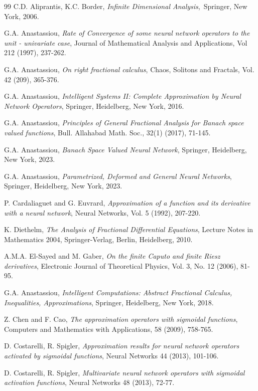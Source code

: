 \documentclass[10pt]{NSP1}
\numberwithin{equation}{section}
\begin{document}
\begin{thebibliography}{99}
 C.D. Aliprantis, K.C. Border, \textit{Infinite Dimensional
Analysis},\ Springer, New York, 2006.

 G.A. Anastassiou, \textit{Rate of Convergence of some neural
network operators to the unit - univariate case}, Journal of Mathematical
Analysis and Applications, Vol 212 (1997), 237-262.

 G.A. Anastassiou, \textit{On right fractional calculus}, Chaos,
Solitons and Fractals, Vol. 42 (209), 365-376.

 G.A. Anastassiou, \textit{Intelligent Systems II: Complete
Approximation by Neural Network Operators}, Springer, Heidelberg, New York,
2016.

 G.A. Anastassiou, \textit{Principles of General Fractional
Analysis for Banach space valued functions}, Bull. Allahabad Math. Soc.,
32(1) (2017), 71-145.

 G.A. Anastassiou, \textit{Banach Space Valued Neural Network},
Springer, Heidelberg, New York, 2023.

 G.A. Anastassiou, \textit{Parametrized, Deformed and General
Neural Networks}, Springer, Heidelberg, New York, 2023.

 P. Cardaliaguet and G. Euvrard, \textit{Approximation of a
function and its derivative with a neural network}, Neural Networks, Vol. 5
(1992), 207-220.

 K. Diethelm, \textit{The Analysis of Fractional Differential
Equations}, Lecture Notes in Mathematics 2004, Springer-Verlag, Berlin,
Heidelberg, 2010.

 A.M.A. El-Sayed and M. Gaber, \textit{On the finite Caputo and
finite Riesz derivatives}, Electronic Journal of Theoretical Physics, Vol.
3, No. 12 (2006), 81-95.

 G.A. Anastassiou, \textit{Intelligent Computations: Abstract
Fractional Calculus, Inequalities, Approximations}, Springer, Heidelberg,
New York, 2018.

 Z. Chen and F. Cao, \textit{The approximation operators with
sigmoidal functions}, Computers and Mathematics with Applications, 58
(2009), 758-765.

 D. Costarelli, R. Spigler, \textit{Approximation results for
neural network operators activated by sigmoidal functions}, Neural Networks
44 (2013), 101-106.

 D. Costarelli, R. Spigler, \textit{Multivariate neural network
operators with sigmoidal activation functions}, Neural Networks 48 (2013),
72-77.


\end{thebibliography}
\end{document}
